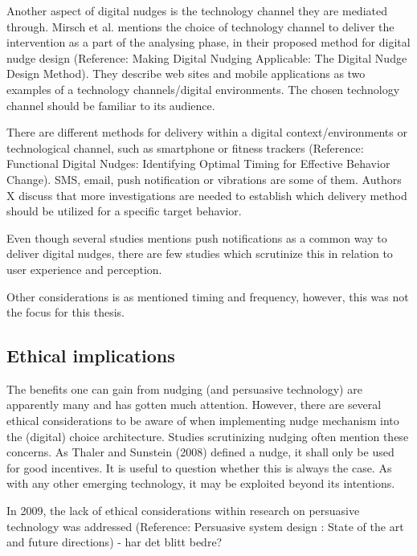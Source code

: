 Another aspect of digital nudges is the technology channel they are mediated through. Mirsch et al. mentions the choice of technology channel to deliver the intervention as a part of the analysing phase, in their proposed method for digital nudge design (Reference: Making Digital Nudging Applicable: The Digital Nudge Design Method). They describe web sites and mobile applications as two examples of a technology channels/digital environments. The chosen technology channel should be familiar to its audience. 

There are different methods for delivery within a digital context/environments or technological channel, such as smartphone or fitness trackers (Reference: Functional Digital Nudges: Identifying Optimal Timing for Effective Behavior Change). SMS, email, push notification or vibrations are some of them. Authors X discuss that more investigations are needed to establish which delivery method should be utilized for a specific target behavior. 

Even though several studies mentions push notifications as a common way to deliver digital nudges, there are few studies which scrutinize this in relation to user experience and perception. 

Other considerations is as mentioned timing and frequency, however, this was not the focus for this thesis.  

\subsection{Ethical implications}
The benefits one can gain from nudging (and persuasive technology) are apparently many and has gotten much attention.  However, there are several ethical considerations to be aware of when implementing nudge mechanism into the (digital) choice architecture. Studies scrutinizing nudging often mention these concerns. As Thaler and Sunstein (2008) defined a nudge, it shall only be used for good incentives. It is useful to question whether this is always the case. As with any other emerging technology, it may be exploited beyond its intentions. 

In 2009, the lack of ethical considerations within research on persuasive technology was addressed (Reference: Persuasive system design : State of the art and future directions) - har det blitt bedre? 

